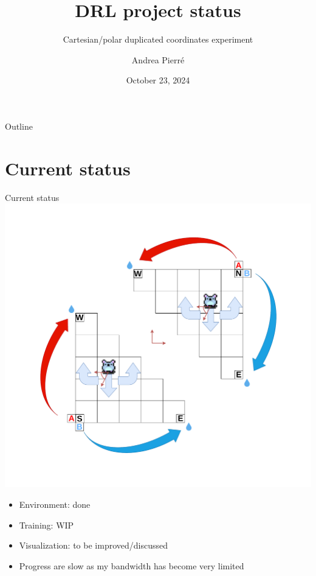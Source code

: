 \documentclass[bigger]{beamer}
\author{Andrea Pierré}
\date{October 23, 2024}
\title{DRL project status}
\subtitle{Cartesian/polar duplicated coordinates experiment}
\begin{document}
\maketitle
\begin{frame}[plain]{Outline}
\tableofcontents
\end{frame}

\section{Current status}
\label{sec:org8b3a9c7}
\begin{frame}[label={sec:orgffe6cad}]{Current status}
\centering
\includegraphics[height=0.55\textheight, trim=3cm 3cm 3cm 3cm, clip=true]{img/RL_env-cartesian-polar.drawio.pdf}
\begin{itemize}
\item Environment: done
\item Training: WIP
\item Visualization: to be improved/discussed
\item Progress are slow as my bandwidth has become very limited
\end{itemize}
\end{frame}
\end{document}
